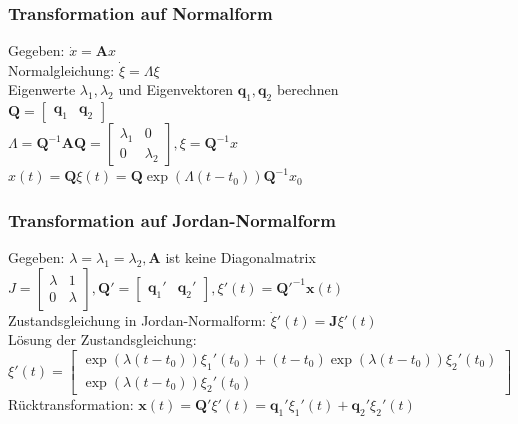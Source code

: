 \documentclass[fs, footer]{latex4ei}
\begin{document}
\begin{multicols*}{4}
\subsubsection{Transformation auf Normalform}
Gegeben: $\dot{x} = \mathbf{A} x$\\
Normalgleichung: $\dot{\xi} = \Lambda \xi$\\
Eigenwerte $\lambda_1, \lambda_2$ und Eigenvektoren $\mathbf{q}_1, \mathbf{q}_2$ berechnen\\
$\mathbf{Q} =  \begin{bmatrix} \mathbf{q}_1 & \mathbf{q}_2 \end{bmatrix}$\\
$\Lambda = \mathbf{Q}^{-1}\mathbf{A}\mathbf{Q} = \begin{bmatrix} \lambda_1 & 0 \\ 0 & \lambda_2 \end{bmatrix}, \xi = \mathbf{Q}^{-1} x$\\
$x(t) = \mathbf{Q} \xi(t) = \mathbf{Q} \exp(\Lambda(t-t_0))\mathbf{Q}^{-1} x_0$\\
\subsubsection{Transformation auf Jordan-Normalform}
Gegeben: $\lambda = \lambda_1 = \lambda_2, \mathbf{A}$ ist keine Diagonalmatrix\\
$J = \begin{bmatrix} \lambda & 1 \\ 0 & \lambda \end{bmatrix}, \mathbf{Q}' = \begin{bmatrix} \mathbf{q}_1' & \mathbf{q}_2' \end{bmatrix}, \xi'(t) = \mathbf{Q}'^{-1}\mathbf{x}(t)$\\
Zustandsgleichung in Jordan-Normalform: $\dot{\xi}'(t) = \mathbf{J} \xi'(t)$\\
Lösung der Zustandsgleichung:\\ $\xi'(t) = \begin{bmatrix} \exp(\lambda(t-t_0))\xi_1'(t_0)+(t-t_0)\exp(\lambda(t-t_0))\xi_2'(t_0) \\ \exp(\lambda(t-t_0))\xi_2'(t_0) \end{bmatrix}$\\
Rücktransformation: $\mathbf{x}(t) = \mathbf{Q}'\xi'(t) = \mathbf{q}_1'\xi_1'(t) + \mathbf{q}_2'\xi_2'(t)$\\

\end{multicols*}
\end{document}
